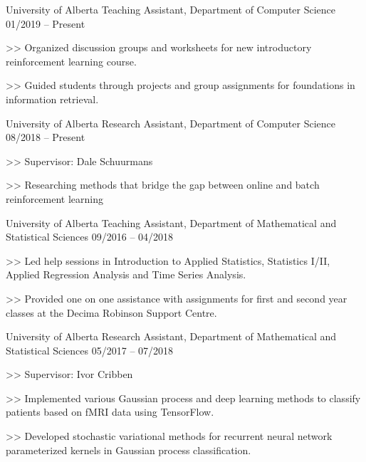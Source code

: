 \begin{cventries}
\cventry
    {University of Alberta}
    {Teaching Assistant, Department of Computer Science}
    {01/2019 -- Present}
    {
      \begin{cvitems}
        \item[>>] Organized discussion groups and worksheets for new introductory reinforcement learning course.
        \item[>>] Guided students through projects and group assignments for foundations in information retrieval.
      \end{cvitems}
    }

\cventry
    {University of Alberta}
    {Research Assistant, Department of Computer Science}
    {08/2018 -- Present}
    {
      \begin{cvitems}
      \item[>>] Supervisor: Dale Schuurmans 
      \item[>>] Researching methods that bridge the gap between online and batch
      reinforcement learning
      \end{cvitems}
    }

  \cventry
    {University of Alberta}
    {Teaching Assistant, Department of Mathematical and Statistical Sciences} {09/2016 -- 04/2018}
    {
      \begin{cvitems}
        \item[>>] Led help sessions in Introduction to Applied Statistics, Statistics I/II, Applied Regression Analysis and Time Series Analysis.
        \item[>>] Provided one on one assistance with assignments for first and second year classes at the Decima Robinson Support Centre.
      \end{cvitems}
    }

\cventry
    {University of Alberta}
    {Research Assistant, Department of Mathematical and Statistical Sciences}    {05/2017 -- 07/2018}
    {
      \begin{cvitems}
        \item[>>] Supervisor: Ivor Cribben
        \item[>>] Implemented various Gaussian process and deep learning methods to classify patients based on fMRI data using TensorFlow.
        \item[>>] Developed stochastic variational methods for recurrent neural network parameterized kernels in Gaussian process classification.
      \end{cvitems}
    }

\end{cventries}
